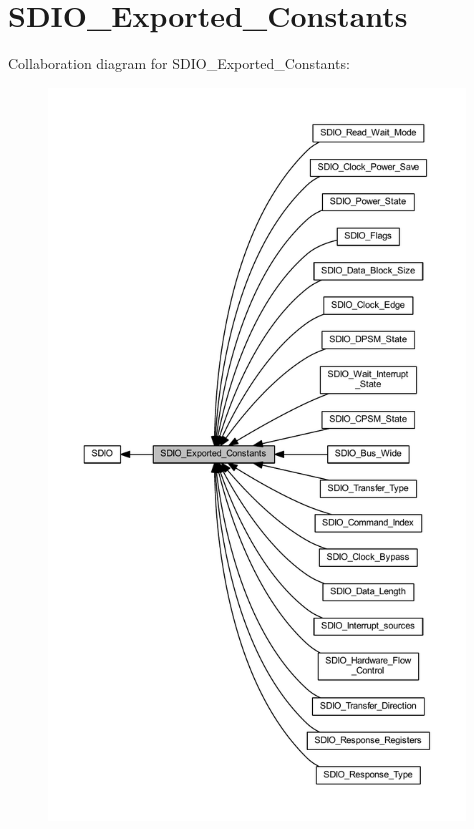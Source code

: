 \hypertarget{group___s_d_i_o___exported___constants}{}\section{S\+D\+I\+O\+\_\+\+Exported\+\_\+\+Constants}
\label{group___s_d_i_o___exported___constants}
Collaboration diagram for S\+D\+I\+O\+\_\+\+Exported\+\_\+\+Constants\+:
\nopagebreak
\begin{figure}[H]
\begin{center}
\leavevmode
\includegraphics[height=550pt]{group___s_d_i_o___exported___constants}
\end{center}
\end{figure}
